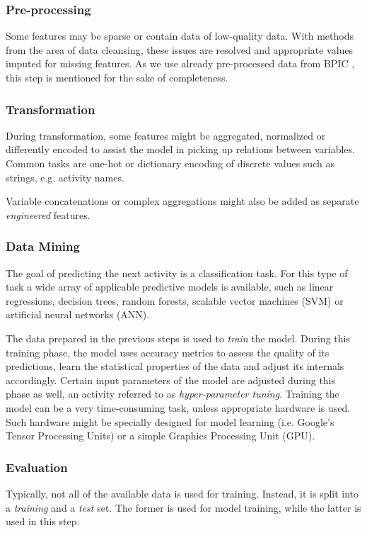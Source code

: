 \subsubsection{Pre-processing}
Some features may be sparse or contain data of low-quality data. With methods from the area of data cleansing, these issues are resolved and appropriate values imputed for missing features. As we use already pre-processed data from BPIC \cite{BPIC2011, BPIC2012, BPIC2017}, this step is mentioned for the sake of completeness.

\subsubsection{Transformation}
\label{sec:predictive-model-development:transformation}
During transformation, some features might be aggregated, normalized or differently encoded to assist the model in picking up relations between variables. Common tasks are one-hot or dictionary encoding of discrete values such as strings, e.g. activity names.

Variable concatenations or complex aggregations might also be added as separate \textit{engineered} features.

\subsubsection{Data Mining}
The goal of predicting the next activity is a classification task. For this type of task a wide array of applicable predictive models is available, such as linear regressions, decision trees, random forests, scalable vector machines (SVM) or artificial neural networks (ANN).

The data prepared in the previous steps is used to \textit{train} the model. During this training phase, the model uses accuracy metrics to assess the quality of its predictions, learn the statistical properties of the data and adjust its internals accordingly. Certain input parameters of the model are adjusted during this phase as well, an activity referred to as \textit{hyper-parameter tuning}. Training the model can be a very time-consuming task, unless appropriate hardware is used. Such hardware might be specially designed for model learning (i.e. Google's Tensor Processing Units) or a simple Graphics Processing Unit (GPU).

\subsubsection{Evaluation}
Typically, not all of the available data is used for training. Instead, it is split into a \textit{training} and a \textit{test} set. The former is used for model training, while the latter is used in this step.

